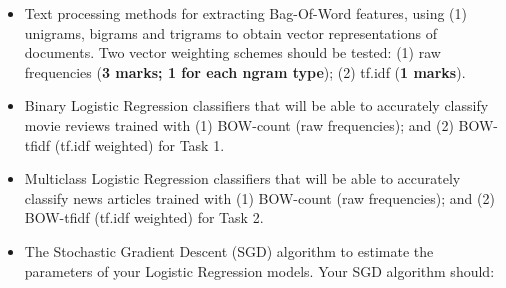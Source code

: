 \documentclass[11pt]{article}
\providecommand{\tightlist}{%
      \setlength{\itemsep}{0pt}\setlength{\parskip}{0pt}}
\begin{document}
\begin{itemize}
\tightlist
\item
  Text processing methods for extracting Bag-Of-Word features, using (1)
  unigrams, bigrams and trigrams to obtain vector representations of
  documents. Two vector weighting schemes should be tested: (1) raw
  frequencies (\textbf{3 marks; 1 for each ngram type}); (2) tf.idf
  (\textbf{1 marks}).
\item
  Binary Logistic Regression classifiers that will be able to accurately
  classify movie reviews trained with (1) BOW-count (raw frequencies);
  and (2) BOW-tfidf (tf.idf weighted) for Task 1.
\item
  Multiclass Logistic Regression classifiers that will be able to
  accurately classify news articles trained with (1) BOW-count (raw
  frequencies); and (2) BOW-tfidf (tf.idf weighted) for Task 2.
\item
  The Stochastic Gradient Descent (SGD) algorithm to estimate the
  parameters of your Logistic Regression models. Your SGD algorithm
  should:


\end{itemize}
\end{document}

